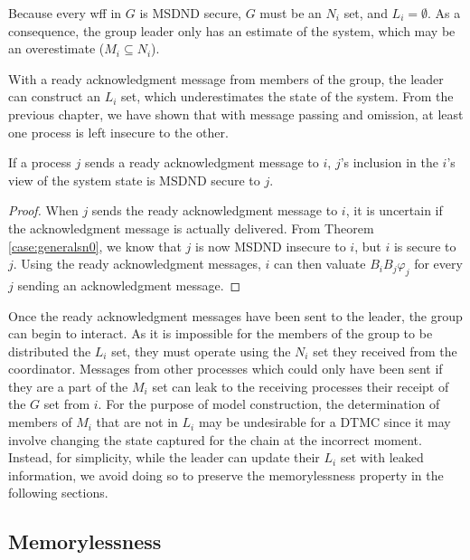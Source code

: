 Because every wff in $G$ is MSDND secure, $G$ must be an $N_i$ set, and $L_i = \emptyset$.
As a consequence, the group leader only has an estimate of the system, which may be an overestimate ($M_i \subseteq N_i$).

With a ready acknowledgment message from members of the group, the leader can construct an $L_i$ set, which underestimates the state of the system.
From the previous chapter, we have shown that with message passing and omission, at least one process is left insecure to the other.

\begin{thm}
    If a process $j$ sends a ready acknowledgment message to $i$, $j$'s inclusion in the $i$'s view of the system state is MSDND secure to $j$.
\end{thm}

\begin{proof}
When $j$ sends the ready acknowledgment message to $i$, it is uncertain if the acknowledgment message is actually delivered.
From Theorem \ref{case:generalsn0}, we know that $j$ is now MSDND insecure to $i$, but $i$ is secure to $j$.
Using the ready acknowledgment messages, $i$ can then valuate $B_i B_j \varphi_j$ for every $j$ sending an acknowledgment message.
\end{proof}

Once the ready acknowledgment messages have been sent to the leader, the group can begin to interact.
As it is impossible for the members of the group to be distributed the $L_i$ set, they must operate using the $N_i$ set they received from the coordinator.
Messages from other processes which could only have been sent if they are a part of the $M_i$ set can leak to the receiving processes their receipt of the $G$ set from $i$.
For the purpose of model construction, the determination of members of $M_i$ that are not in $L_i$ may be undesirable for a \ac{DTMC} since it may involve changing the state captured for the chain at the incorrect moment.
Instead, for simplicity, while the leader can update their $L_i$ set with leaked information, we avoid doing so to preserve the memorylessness property in the following sections.



\subsection{Memorylessness}

